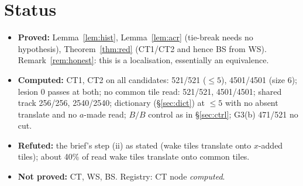 \section{Status}
\begin{itemize}
\item \textbf{Proved:} Lemma~\ref{lem:hist}, Lemma~\ref{lem:acr} (tie-break needs no hypothesis), Theorem~\ref{thm:red} (CT1/CT2 and hence BS from WS). Remark~\ref{rem:honest}: this is a localisation, essentially an equivalence.
\item \textbf{Computed:} CT1, CT2 on all candidates: 521/521 ($\le5$), 4501/4501 (size 6); lesion 0 passes at both; no common tile read: 521/521, 4501/4501; shared track 256/256, 2540/2540; dictionary (\S\ref{sec:dict}) at $\le5$ with no absent translate and no $a$-made read; $B/B$ control as in \S\ref{sec:ctrl}; G3(b) 471/521 no cut.
\item \textbf{Refuted:} the brief's step (ii) as stated (wake tiles translate onto $x$-added tiles); about 40\% of read wake tiles translate onto common tiles.
\item \textbf{Not proved:} CT, WS, BS. Registry: CT node \emph{computed}.
\end{itemize}
